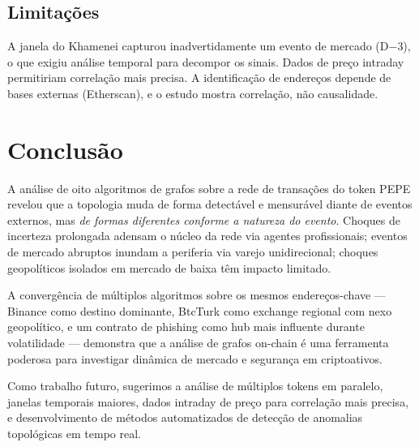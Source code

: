 \documentclass[12pt,a4paper]{article}
\begin{document}
\subsection{Limitações}

A janela do Khamenei capturou inadvertidamente um evento de mercado (D$-$3), o que exigiu análise temporal para decompor os sinais. Dados de preço intraday permitiriam correlação mais precisa. A identificação de endereços depende de bases externas (Etherscan), e o estudo mostra correlação, não causalidade.

\section{Conclusão}

A análise de oito algoritmos de grafos sobre a rede de transações do token PEPE revelou que a topologia muda de forma detectável e mensurável diante de eventos externos, mas \textit{de formas diferentes conforme a natureza do evento}. Choques de incerteza prolongada adensam o núcleo da rede via agentes profissionais; eventos de mercado abruptos inundam a periferia via varejo unidirecional; choques geopolíticos isolados em mercado de baixa têm impacto limitado.

A convergência de múltiplos algoritmos sobre os mesmos endereços-chave --- Binance como destino dominante, BtcTurk como exchange regional com nexo geopolítico, e um contrato de phishing como hub mais influente durante volatilidade --- demonstra que a análise de grafos on-chain é uma ferramenta poderosa para investigar dinâmica de mercado e segurança em criptoativos.

Como trabalho futuro, sugerimos a análise de múltiplos tokens em paralelo, janelas temporais maiores, dados intraday de preço para correlação mais precisa, e desenvolvimento de métodos automatizados de detecção de anomalias topológicas em tempo real.
\end{document}
